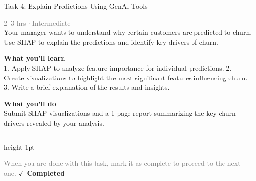 \documentclass[10pt,a4paper]{article}
\begin{document}
\begin{taskbox}{Task 4: Explain Predictions Using GenAI Tools}

    {\small \textcolor{gray}{2--3 hrs $\cdot$ Intermediate}}\\[12pt]

      
Your manager wants to understand why certain customers are predicted to churn. Use SHAP to explain the predictions and identify key drivers of churn.  


\vspace{8pt}
{\large \textbf{\textcolor{brandLight}{What you'll learn}}}\\[4pt]  
1. Apply SHAP to analyze feature importance for individual predictions.  
2. Create visualizations to highlight the most significant features influencing churn.  
3. Write a brief explanation of the results and insights.  

\vspace{8pt}
{\large \textbf{\textcolor{brandLight}{What you'll do}}}\\[4pt]  
Submit SHAP visualizations and a 1-page report summarizing the key churn drivers revealed by your analysis.\par

    \vspace{16pt}

    \textcolor{cardBorder}{\hrule height 1pt}\vspace{8pt}

    \small \textcolor{gray}{When you are done with this task, mark it as complete to proceed to the next one.} \hfill \textbf{\textcolor{brandDark}{$\checkmark$ Completed}}

\end{taskbox}
\end{document}
